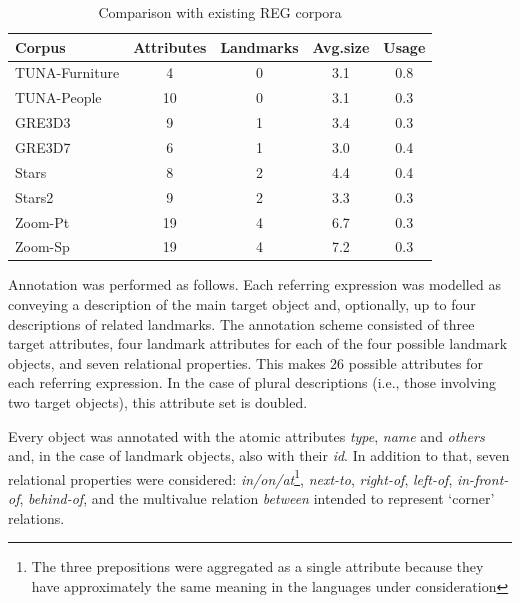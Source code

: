 \begin{table}[ht]
\begin{center}
\footnotesize{
\caption{Comparison with existing REG corpora}
\label{tab-comparison}
\begin{tabular} {  l c c c c}
\hline
Corpus											& Attributes			& Landmarks			& Avg.size	& Usage \\
\hline
TUNA-Furniture							& 4								& 0							&	3.1				& 0.8   \\
TUNA-People									& 10							& 0							& 3.1				& 0.3   \\
GRE3D3											&	9								& 1							& 3.4				& 0.3   \\
GRE3D7											&	6								& 1							& 3.0				& 0.4   \\
Stars												&	8								& 2							& 4.4				& 0.4   \\
Stars2											& 9								& 2							& 3.3				& 0.3   \\
Zoom-Pt											& 19							& 4							& 6.7				& 0.3   \\
Zoom-Sp											& 19							& 4							& 7.2				& 0.3   \\
\hline
\end{tabular}
}
\end{center}
\end{table}


Annotation was performed as follows. Each referring expression was modelled as conveying a description of the main target object and, optionally, up to four descriptions of related landmarks. The annotation scheme consisted of three target attributes, four landmark attributes for each of the four possible landmark objects, and seven relational properties. This makes 26 possible attributes for each referring expression. In the case of plural descriptions (i.e., those involving two target objects), this attribute set is doubled.

Every object was annotated with the atomic attributes {\em type}, {\em name} and {\em others} and, in the case of landmark objects, also with their {\em id}. In addition to that, seven relational properties were considered: {\em in/on/at}\footnote{The three prepositions were aggregated as a single attribute because they have approximately the same meaning in the languages under consideration}, {\em next-to}, {\em right-of}, {\em left-of}, {\em in-front-of}, {\em behind-of}, and the multivalue relation {\em between} intended to represent `corner' relations. 

